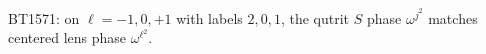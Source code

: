 \begin{center}\small
BT1571: on $\ell=-1,0,+1$ with labels $2,0,1$, the qutrit $S$ phase $\omega^{j^2}$ matches centered lens phase $\omega^{\ell^2}$.
\end{center}
